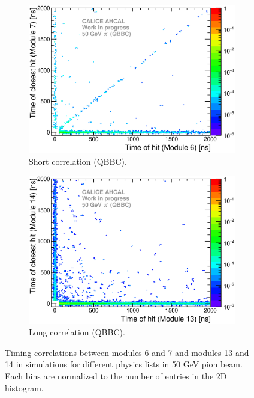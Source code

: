 \begin{figure}[htbp!]
  \hfill
  \begin{subfigure}[t]{0.49\textwidth}
    \centering
    \includegraphics[width=1\textwidth]{../Thesis_Plots/Timing/Pions/Plots/ComparisonToSim/Time_Correlation_50GeV_short_QBBC_DD4hep.eps}
    \caption{Short correlation (QBBC).} \label{fig:Corr_short_QBBC_DD4hep}
  \end{subfigure}
  \hfill
  \begin{subfigure}[t]{0.49\textwidth}
    \centering
    \includegraphics[width=1\textwidth]{../Thesis_Plots/Timing/Pions/Plots/ComparisonToSim/Time_Correlation_50GeV_long_QBBC_DD4hep.eps}
    \caption{Long correlation (QBBC).} \label{fig:Corr_long_QBBC_DD4hep}
  \end{subfigure}
  \caption{Timing correlations between modules 6 and 7 and modules 13 and 14 in \ddhep simulations for different physics lists in 50 GeV pion beam. Each bins are normalized to the number of entries in the 2D histogram.}
\end{figure}

